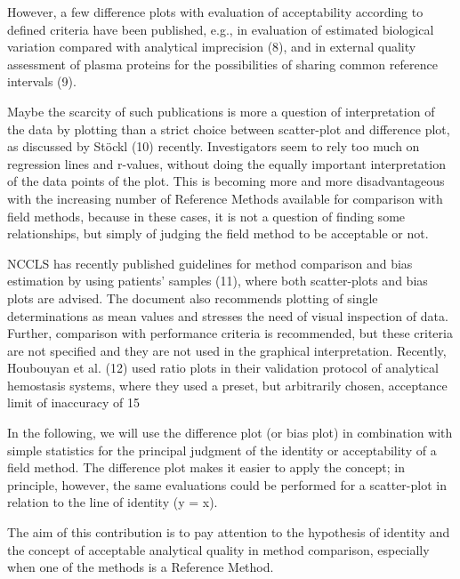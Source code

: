 However, a few difference plots with evaluation of acceptability according to defined criteria have been published, e.g., in evaluation of estimated biological variation compared with analytical imprecision (8), and in external quality assessment of plasma proteins for the possibilities of sharing common reference intervals (9).

Maybe the scarcity of such publications is more a question of interpretation of the data by plotting than a strict choice between scatter-plot and difference plot, as discussed by Stöckl (10) recently. Investigators seem to rely too much on regression lines and r-values, without doing the equally important interpretation of the data points of the plot. This is becoming more and more disadvantageous with the increasing number of Reference Methods available for comparison with field methods, because in these cases, it is not a question of finding some relationships, but simply of judging the field method to be acceptable or not.

NCCLS has recently published guidelines for method comparison and bias estimation by using patients’ samples (11), where both scatter-plots and bias plots are advised. The document also recommends plotting of single determinations as mean values and stresses the need of visual inspection of data. Further, comparison with performance criteria is recommended, but these criteria are not specified and they are not used in the graphical interpretation. Recently, Houbouyan et al. (12) used ratio plots in their validation protocol of analytical hemostasis systems, where they used a preset, but arbitrarily chosen, acceptance limit of inaccuracy of 15%

In the following, we will use the difference plot (or bias plot) in combination with simple statistics for the principal judgment of the identity or acceptability of a field method. The difference plot makes it easier to apply the concept; in principle, however, the same evaluations could be performed for a scatter-plot in relation to the line of identity (y = x).

The aim of this contribution is to pay attention to the hypothesis of identity and the concept of acceptable analytical quality in method comparison, especially when one of the methods is a Reference Method.
